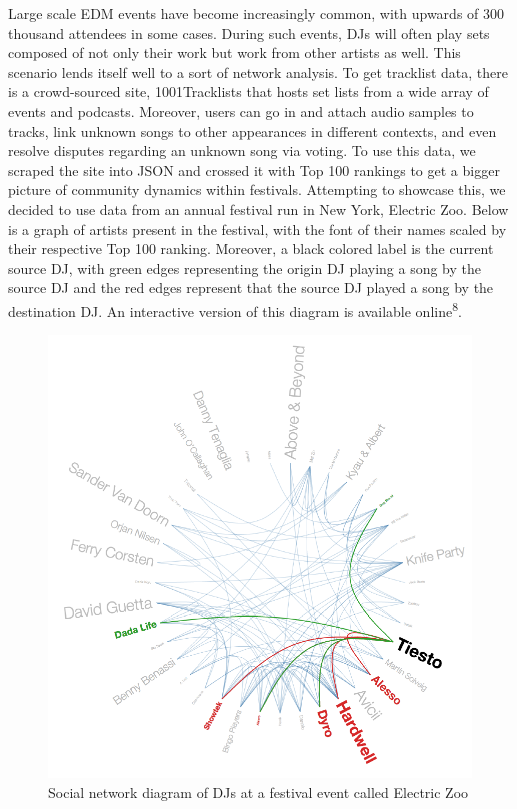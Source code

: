 \documentclass[12pt]{dalcsthesis}
\begin{document}
Large scale EDM events have become increasingly common, with upwards of 300 thousand attendees in some cases. During such events, DJs will often play sets composed of not only their work but work from other artists as well. This scenario lends itself well to a sort of network analysis. To get tracklist data, there is a crowd-sourced site, 1001Tracklists that hosts set lists from a wide array of events and podcasts. Moreover, users can go in and attach audio samples to tracks, link unknown songs to other appearances in different contexts, and even resolve disputes regarding an unknown song via voting. To use this data, we scraped the site into JSON and crossed it with Top 100 rankings to get a bigger picture of community dynamics within festivals. Attempting to showcase this, we decided to use data from an annual festival run in New York, Electric Zoo. Below is a graph of artists present in the festival, with the font of their names scaled by their respective Top 100 ranking. Moreover, a black colored label is the current source DJ, with green edges representing the origin DJ playing a song by the source DJ and the red edges represent that the source DJ played a song by the destination DJ. An interactive version of this diagram is available online\textsuperscript{8}. 

\begin{figure}[h]
\includegraphics[scale=.7]{network_diagram}
\centering
\caption{Social network diagram of DJs at a festival event called Electric Zoo}
\end{figure} \newpage
\end{document}
